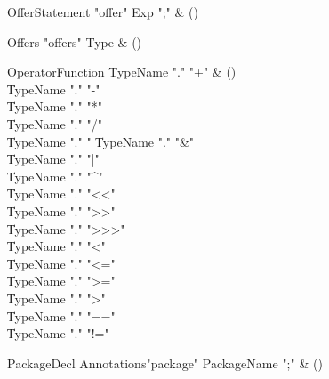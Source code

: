 \begin{bbgrammar}

OfferStatement \label{prod:OfferStatement}  \: \xcd"offer" Exp \xcd";" & () \\


\end{bbgrammar}

\begin{bbgrammar}

Offers \label{prod:Offers}  \: \xcd"offers" Type & () \\


\end{bbgrammar}

\begin{bbgrammar}

OperatorFunction \label{prod:OperatorFunction}  \: TypeName \xcd"." \xcd"+" & () \\

    \| TypeName \xcd"." \xcd"-" \\
    \| TypeName \xcd"." \xcd"*" \\
    \| TypeName \xcd"." \xcd"/" \\
    \| TypeName \xcd"." \xcd"%
    \| TypeName \xcd"." \xcd"&" \\
    \| TypeName \xcd"." \xcd"|" \\
    \| TypeName \xcd"." \xcd"^" \\
    \| TypeName \xcd"." \xcd"<<" \\
    \| TypeName \xcd"." \xcd">>" \\
    \| TypeName \xcd"." \xcd">>>" \\
    \| TypeName \xcd"." \xcd"<" \\
    \| TypeName \xcd"." \xcd"<=" \\
    \| TypeName \xcd"." \xcd">=" \\
    \| TypeName \xcd"." \xcd">" \\
    \| TypeName \xcd"." \xcd"==" \\
    \| TypeName \xcd"." \xcd"!=" \\

\end{bbgrammar}

\begin{bbgrammar}

PackageDecl \label{prod:PackageDecl}  \: Annotations\opt \xcd"package" PackageName \xcd";" & () \\


\end{bbgrammar}

